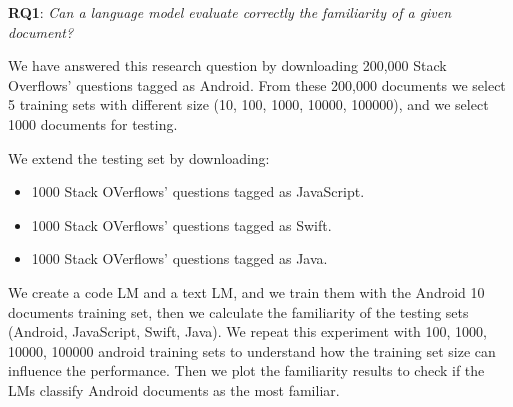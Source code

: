 \documentclass[12pt,mscthesis]{usiinfthesis}
\begin{document}
	 \textbf{RQ1}: \emph{Can a language model evaluate correctly the familiarity of a given document?}


		We have answered this research question by downloading 200,000 Stack Overflows' questions tagged as Android. From these 200,000 documents we select 5 training sets with different size (10, 100, 1000, 10000, 100000), and we select 1000 documents for testing.


		We extend the testing set by downloading: 
		\begin{itemize}
			\item 1000 Stack OVerflows' questions tagged as JavaScript.
			\item 1000 Stack OVerflows' questions tagged as Swift.
			\item 1000 Stack OVerflows' questions tagged as Java.
		\end{itemize}

		We create a code LM and a text LM, and we train them with the Android 10 documents training set, then we calculate the familiarity of the testing sets
		(Android, JavaScript, Swift, Java). We repeat this experiment with 100, 1000, 10000, 100000 android training sets to understand how the training set size can influence the performance. Then we plot the familiarity results to check if the LMs classify Android documents as the most familiar.\\
\end{document}
